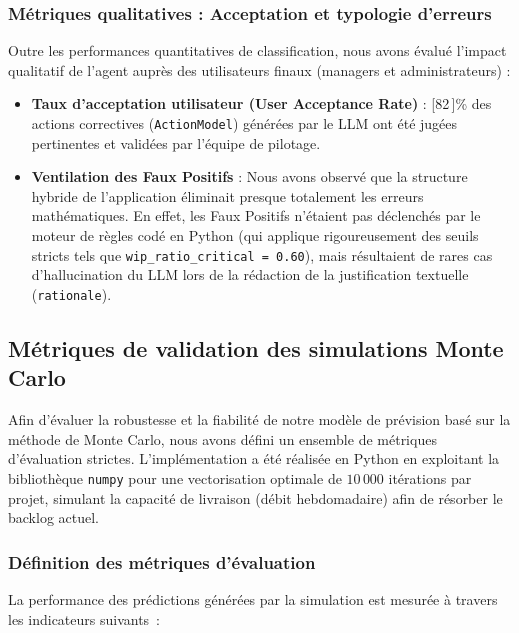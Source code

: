\subsubsection{Métriques qualitatives : Acceptation et typologie d'erreurs}
Outre les performances quantitatives de classification, nous avons évalué l'impact qualitatif de l'agent auprès des utilisateurs finaux (managers et administrateurs) :
\begin{itemize}
    \renewcommand{\labelitemi}{—}
    \item \textbf{Taux d'acceptation utilisateur (User Acceptance Rate)} : [82\,]\% des actions correctives (\texttt{ActionModel}) générées par le LLM ont été jugées pertinentes et validées par l'équipe de pilotage.
    \item \textbf{Ventilation des Faux Positifs} : Nous avons observé que la structure hybride de l'application éliminait presque totalement les erreurs mathématiques. En effet, les Faux Positifs n'étaient pas déclenchés par le moteur de règles codé en Python (qui applique rigoureusement des seuils stricts tels que \texttt{wip\_ratio\_critical = 0.60}), mais résultaient de rares cas d'hallucination du LLM lors de la rédaction de la justification textuelle (\texttt{rationale}). 
\end{itemize}

\subsection{Métriques de validation des simulations Monte Carlo}

Afin d'évaluer la robustesse et la fiabilité de notre modèle de prévision basé sur la méthode de Monte Carlo, nous avons défini un ensemble de métriques d'évaluation strictes. L'implémentation a été réalisée en Python en exploitant la bibliothèque \texttt{numpy} pour une vectorisation optimale de $10\,000$ itérations par projet, simulant la capacité de livraison (débit hebdomadaire) afin de résorber le backlog actuel.

\subsubsection{Définition des métriques d'évaluation}

La performance des prédictions générées par la simulation est mesurée à travers les indicateurs suivants~:

